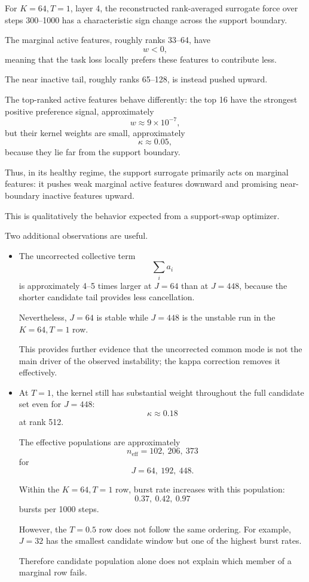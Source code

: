 \documentclass[11pt,a4paper]{article}
\newcommand{\neff}{n_{\mathrm{eff}}}
\begin{document}
For \(K=64,T=1\), layer 4, the reconstructed rank-averaged surrogate force over
steps 300--1000 has a characteristic sign change across the support boundary.

The marginal active features, roughly ranks 33--64, have
\[
w<0,
\]
meaning that the task loss locally prefers these features to contribute less.

The near inactive tail, roughly ranks 65--128, is instead pushed upward.

The top-ranked active features behave differently:
the top 16 have the strongest positive preference signal,
approximately
\[
w\approx 9\times10^{-7},
\]
but their kernel weights are small,
approximately
\[
\kappa\approx0.05,
\]
because they lie far from the support boundary.

Thus, in its healthy regime, the support surrogate primarily acts on marginal
features:
it pushes weak marginal active features downward and promising near-boundary
inactive features upward.

This is qualitatively the behavior expected from a support-swap optimizer.

Two additional observations are useful.

\begin{itemize}[leftmargin=1.4em]

\item
The uncorrected collective term
\[
\sum_i a_i
\]
is approximately 4--5 times larger at \(J=64\) than at \(J=448\), because the
shorter candidate tail provides less cancellation.

Nevertheless, \(J=64\) is stable while \(J=448\) is the unstable run in the
\(K=64,T=1\) row.

This provides further evidence that the uncorrected common mode is not the
main driver of the observed instability; the kappa correction removes it
effectively.

\item
At \(T=1\), the kernel still has substantial weight throughout the full
candidate set even for \(J=448\):
\[
\kappa\approx0.18
\]
at rank 512.

The effective populations are approximately
\[
\neff=102,\ 206,\ 373
\]
for
\[
J=64,\ 192,\ 448.
\]

Within the \(K=64,T=1\) row, burst rate increases with this population:
\[
0.37,\ 0.42,\ 0.97
\]
bursts per 1000 steps.

However, the \(T=0.5\) row does not follow the same ordering.
For example, \(J=32\) has the smallest candidate window but one of the highest
burst rates.

Therefore candidate population alone does not explain which member of a
marginal row fails.

\end{itemize}
\end{document}
